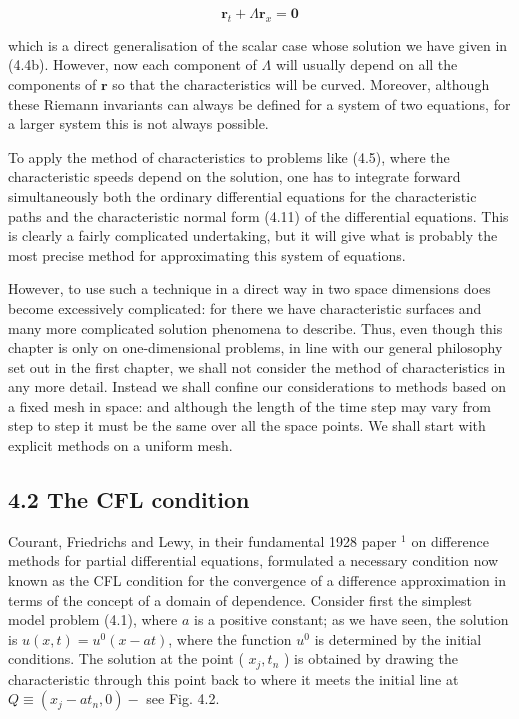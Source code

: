 \documentclass[10pt]{article}
\begin{document}
\[
\mathbf{r}_{t}+\Lambda \mathbf{r}_{x}=\mathbf{0}
\]

which is a direct generalisation of the scalar case whose solution we have given in (4.4b). However, now each component of \(\Lambda\) will usually depend on all the components of \(\mathbf{r}\) so that the characteristics will be curved. Moreover, although these Riemann invariants can always be defined for a system of two equations, for a larger system this is not always possible.

To apply the method of characteristics to problems like (4.5), where the characteristic speeds depend on the solution, one has to integrate forward simultaneously both the ordinary differential equations for the characteristic paths and the characteristic normal form (4.11) of the differential equations. This is clearly a fairly complicated undertaking, but it will give what is probably the most precise method for approximating this system of equations.

However, to use such a technique in a direct way in two space dimensions does become excessively complicated: for there we have characteristic surfaces and many more complicated solution phenomena to describe. Thus, even though this chapter is only on one-dimensional problems, in line with our general philosophy set out in the first chapter, we shall not consider the method of characteristics in any more detail. Instead we shall confine our considerations to methods based on a fixed mesh in space: and although the length of the time step may vary from step to step it must be the same over all the space points. We shall start with explicit methods on a uniform mesh.

\subsection*{4.2 The CFL condition}
Courant, Friedrichs and Lewy, in their fundamental 1928 paper \({ }^{1}\) on difference methods for partial differential equations, formulated a necessary condition now known as the CFL condition for the convergence of a difference approximation in terms of the concept of a domain of dependence. Consider first the simplest model problem (4.1), where \(a\) is a positive constant; as we have seen, the solution is \(u(x, t)=u^{0}(x-a t)\), where the function \(u^{0}\) is determined by the initial conditions. The solution at the point ( \(x_{j}, t_{n}\) ) is obtained by drawing the characteristic through this point back to where it meets the initial line at \(Q \equiv\left(x_{j}-a t_{n}, 0\right)-\) see Fig. 4.2.
\end{document}
